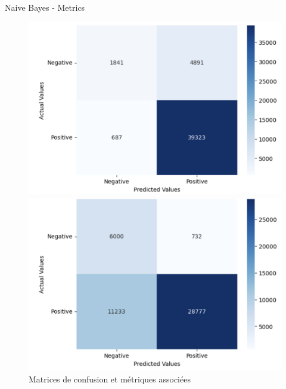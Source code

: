 \documentclass{beamer}
\begin{document}
\begin{frame}{Naive Bayes - Metrics}
\begin{figure}[H]
    \begin{minipage}[c]{0.45\textwidth}
        \centering
        \includegraphics[width=1.2\textwidth]{nb_mat_no_undersampling.png} 
    \end{minipage}\hfill
    \begin{minipage}[c]{0.45\textwidth}
        \centering
        \includegraphics[width=1.2\textwidth]{nb_mat_undersampling.png}
    \end{minipage}
    \caption{Matrices de confusion et métriques associées}
\end{figure}

\begin{table}
\centering
{}
\label{subfig:scores}
\end{table}
\end{frame}
\end{document}
